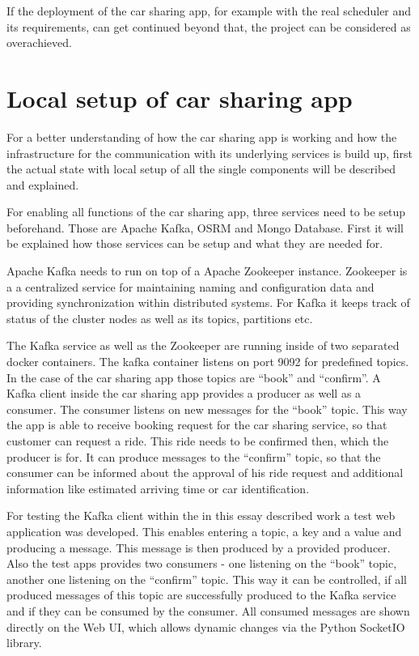 If the deployment of the car sharing app, for example with the real scheduler and its requirements, can get continued beyond that, the project can be considered as overachieved.

\section{Local setup of car sharing app}

For a better understanding of how the car sharing app is working and how the infrastructure for the communication with its underlying services is build up, first the   actual state with local setup of all the single components will be described and explained.

For enabling all functions of the car sharing app, three services need to be setup beforehand. Those are Apache Kafka, OSRM and Mongo Database. First it will be explained how those services can be setup and what they are needed for.

Apache Kafka needs to run on top of a Apache Zookeeper instance. Zookeeper is a a centralized service for maintaining naming and configuration data and providing synchronization within distributed systems. For Kafka it keeps track of status of the cluster nodes as well as its topics, partitions etc.


The Kafka service as well as the Zookeeper are running inside of two separated docker containers. The kafka container listens on port 9092 for predefined topics. In the case of the car sharing app those topics are ``book'' and ``confirm''. A Kafka client inside the car sharing app provides a producer as well as a consumer. The consumer listens on new messages for the ``book'' topic. This way the app is able to receive booking request for the car sharing service, so that customer can request a ride. This ride needs to be confirmed then, which the producer is for. It can produce messages to the ``confirm'' topic, so that the consumer can be informed about the approval of his ride request and additional information like estimated arriving time or car identification.

For testing the Kafka client within the in this essay described work a test web application was developed. This enables entering a topic, a key and a value and producing a message. This message is then produced by a provided producer.  Also the test apps provides two consumers - one listening on the ``book'' topic, another one listening on the ``confirm'' topic. This way it can be controlled, if all produced messages of this topic are successfully produced to the Kafka service and if they can be consumed by the consumer. All consumed messages are shown directly on the Web UI, which allows dynamic changes via the Python SocketIO library.


